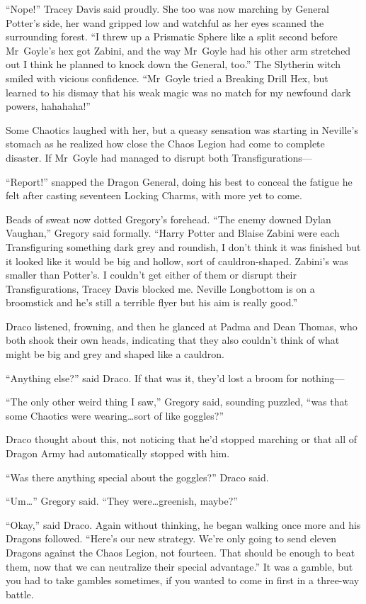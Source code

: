 “Nope!” Tracey Davis said proudly. She too was now marching by General Potter’s side, her wand gripped low and watchful as her eyes scanned the surrounding forest. “I threw up a Prismatic Sphere like a split second before Mr~Goyle’s hex got Zabini, and the way Mr~Goyle had his other arm stretched out I think he planned to knock down the General, too.” The Slytherin witch smiled with vicious confidence. “Mr~Goyle tried a Breaking Drill Hex, but learned to his dismay that his weak magic was no match for my newfound dark powers, hahahaha!”

Some Chaotics laughed with her, but a queasy sensation was starting in Neville’s stomach as he realized how close the Chaos Legion had come to complete disaster. If Mr~Goyle had managed to disrupt both Transfigurations—

\later

“Report!” snapped the Dragon General, doing his best to conceal the fatigue he felt after casting seventeen Locking Charms, with more yet to come.

Beads of sweat now dotted Gregory’s forehead. “The enemy downed Dylan Vaughan,” Gregory said formally. “Harry Potter and Blaise Zabini were each Transfiguring something dark grey and roundish, I don’t think it was finished but it looked like it would be big and hollow, sort of cauldron-shaped. Zabini’s was smaller than Potter’s. I couldn’t get either of them or disrupt their Transfigurations, Tracey Davis blocked me. Neville Longbottom is on a broomstick and he’s still a terrible flyer but his aim is really good.”

Draco listened, frowning, and then he glanced at Padma and Dean Thomas, who both shook their own heads, indicating that they also couldn’t think of what might be big and grey and shaped like a cauldron.

“Anything else?” said Draco. If that was it, they’d lost a broom for nothing—

“The only other weird thing I saw,” Gregory said, sounding puzzled, “was that some Chaotics were wearing…sort of like goggles?”

Draco thought about this, not noticing that he’d stopped marching or that all of Dragon Army had automatically stopped with him.

“Was there anything special about the goggles?” Draco said.

“Um…” Gregory said. “They were…greenish, maybe?”

“Okay,” said Draco. Again without thinking, he began walking once more and his Dragons followed. “Here’s our new strategy. We’re only going to send eleven Dragons against the Chaos Legion, not fourteen. That should be enough to beat them, now that we can neutralize their special advantage.” It was a gamble, but you had to take gambles sometimes, if you wanted to come in first in a three-way battle.

